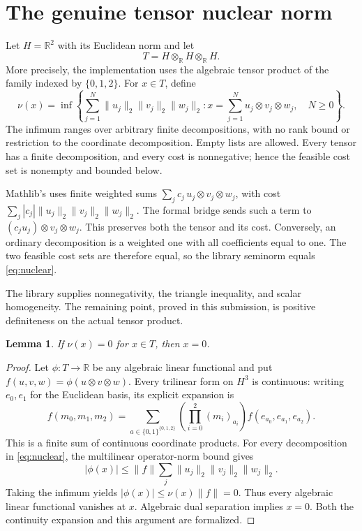\documentclass[11pt]{article}
\newtheorem{lemma}{Lemma}
\newcommand{\R}{\mathbb R}
\newcommand{\code}[1]{\texttt{\detokenize{#1}}}
\begin{document}
\section{The genuine tensor nuclear norm}
Let $H=\R^2$ with its Euclidean norm and let
\[
 T=H\otimes_{\R}H\otimes_{\R}H.
\]
More precisely, the implementation uses the algebraic tensor product of the
family indexed by $\{0,1,2\}$. For $x\in T$, define
\begin{equation}\label{eq:nuclear}
 \nu(x)=\inf\left\{
 \sum_{j=1}^{N}\|u_j\|_2\|v_j\|_2\|w_j\|_2:
 x=\sum_{j=1}^{N}u_j\otimes v_j\otimes w_j,\quad N\ge0
 \right\}.
\end{equation}
The infimum ranges over arbitrary finite decompositions, with no rank bound or
restriction to the coordinate decomposition. Empty lists are allowed. Every
tensor has a finite decomposition, and every cost is nonnegative; hence the
feasible cost set is nonempty and bounded below.

Mathlib's \code{PiTensorProduct.projectiveSeminorm} uses finite weighted sums
$\sum_j c_j\,u_j\otimes v_j\otimes w_j$, with cost
$\sum_j |c_j|\|u_j\|_2\|v_j\|_2\|w_j\|_2$. The formal bridge sends such a
term to $(c_ju_j)\otimes v_j\otimes w_j$. This preserves both the tensor and its
cost. Conversely, an ordinary decomposition is a weighted one with all
coefficients equal to one. The two feasible cost sets are therefore equal,
so the library seminorm equals \eqref{eq:nuclear}.

The library supplies nonnegativity, the triangle inequality, and scalar
homogeneity. The remaining point, proved in this submission, is positive
definiteness on the actual tensor product.

\begin{lemma}\label{lem:definite}
If $\nu(x)=0$ for $x\in T$, then $x=0$.
\end{lemma}
\begin{proof}
Let $\phi:T\to\R$ be any algebraic linear functional and put
$f(u,v,w)=\phi(u\otimes v\otimes w)$. Every trilinear form on $H^3$ is
continuous: writing $e_0,e_1$ for the Euclidean basis, its explicit expansion is
\[
 f(m_0,m_1,m_2)=
 \sum_{a\in\{0,1\}^{\{0,1,2\}}}
 \left(\prod_{i=0}^{2}(m_i)_{a_i}\right)
 f(e_{a_0},e_{a_1},e_{a_2}).
\]
This is a finite sum of continuous coordinate products. For every decomposition
in \eqref{eq:nuclear}, the multilinear operator-norm bound gives
\[
 |\phi(x)|\le \|f\|\sum_j\|u_j\|_2\|v_j\|_2\|w_j\|_2.
\]
Taking the infimum yields $|\phi(x)|\le\nu(x)\|f\|=0$. Thus every algebraic
linear functional vanishes at $x$. Algebraic dual separation implies $x=0$.
Both the continuity expansion and this argument are formalized.
\end{proof}
\end{document}
